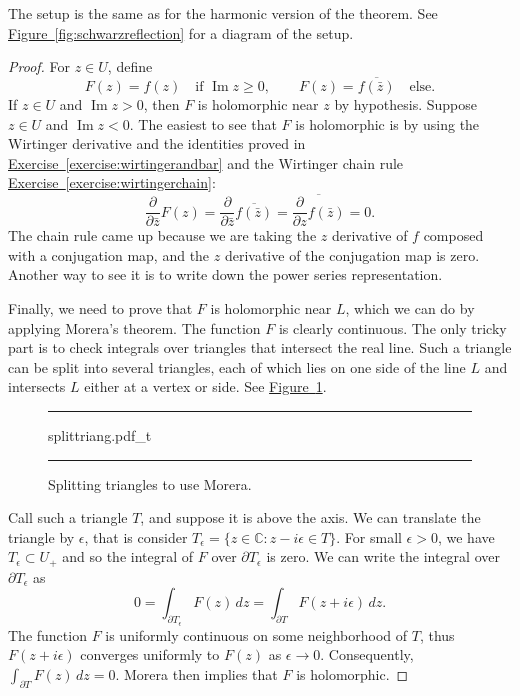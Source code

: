 \documentclass[12pt,openany]{book}
\renewcommand{\Im}{\operatorname{Im}}
\newcommand{\C}{{\mathbb{C}}}
\theoremstyle{plain}
\theoremstyle{remark}
\theoremstyle{definition}
\newenvironment{myfig}{%
\begin{figure}[h!t]
\noindent\rule{\textwidth}{0.5pt}\vspace{12pt}\par\centering}%
{\par\noindent\rule{\textwidth}{0.5pt}
\end{figure}}
\theoremstyle{exercise}
\theoremstyle{example}
\newcommand{\figureref}[1]{\hyperref[#1]{Figure~\ref*{#1}}}
\newcommand{\exerciseref}[1]{\hyperref[#1]{Exercise~\ref*{#1}}}
\begin{document}
The setup is the same as for the harmonic version of the theorem.
See \figureref{fig:schwarzreflection} for a diagram of the setup.

\begin{proof}
For $z \in U$, define
\begin{equation*}
F(z) =
f(z) \quad \text{if } \Im z \geq 0,
\qquad
F(z) =
\overline{f(\bar{z})} \quad \text{else} .
\end{equation*}
If $z \in U$ and $\Im z > 0$, then $F$ is holomorphic near $z$ by hypothesis.
Suppose $z \in U$ and $\Im z < 0$.  The easiest to see that $F$
is holomorphic is by using the Wirtinger derivative and the
identities proved in \exerciseref{exercise:wirtingerandbar} and
the Wirtinger chain rule \exerciseref{exercise:wirtingerchain}:
\begin{equation*}
\frac{\partial}{\partial \bar{z}}
F(z)
=
\frac{\partial}{\partial \bar{z}}
\overline{f(\bar{z})}
=
\overline{
\frac{\partial}{\partial z}
f(\bar{z})
}
=
0 .
\end{equation*}
The chain rule came up because we are taking the $z$ derivative of $f$
composed with a conjugation map, and the $z$ derivative of the conjugation
map is zero.
Another way to see it is to write down the power series representation.

Finally, we need to prove that $F$ is holomorphic near $L$,
which we can do by applying Morera's theorem.  The function $F$ is clearly
continuous.  The only
tricky part is to check integrals over
triangles that intersect the real line.  Such a triangle can be split into
several triangles, each of which lies on one side of the line $L$ and
intersects $L$ either at a vertex or side.  See \figureref{fig:splittriang}.

\begin{myfig}
{splittriang.pdf_t}
\caption{Splitting triangles to use Morera.\label{fig:splittriang}}
\end{myfig}

Call such a triangle $T$, and suppose it is above the axis.
We can translate the triangle by $\epsilon$, that is
consider $T_\epsilon = \{ z \in \C : z-i\epsilon \in T \}$.
For small $\epsilon > 0$, we have
$T_\epsilon \subset U_+$ and so
the integral of $F$ over $\partial T_\epsilon$
is zero.  We can write the integral over $\partial T_\epsilon$
as
\begin{equation*}
0 = \int_{\partial T_\epsilon} F(z) \, dz =
\int_{\partial T} F(z+i\epsilon) \, dz .
\end{equation*}
The function $F$ is uniformly continuous on some neighborhood of $T$,
thus $F(z+i\epsilon)$ converges uniformly to $F(z)$ as $\epsilon \to 0$.
Consequently, $\int_{\partial T} F(z) \, dz = 0$.
Morera then implies that $F$ is holomorphic.
\end{proof}
\end{document}
